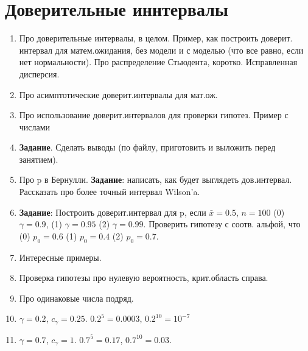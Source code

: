 \section{Доверительные иннтервалы}

\begin{enumerate}
\item	Про доверительные интервалы, в целом. Пример, как построить доверит. интервал для матем.ожидания, без модели и с моделью (что все равно, если нет нормальности). Про распределение Стьюдента, коротко. Исправленная дисперсия.
\item Про асимптотические доверит.интервалы для мат.ож.
\item	Про использование доверит.интервалов для проверки гипотез. Пример с числами
\item	\textbf{Задание}. Сделать выводы (по файлу, приготовить и выложить перед занятием).
\item	Про p в Бернулли. \textbf{Задание}: написать, как будет выглядеть дов.интервал. Рассказать про более точный интервал Wilson’a.
\item	\textbf{Задание}: Построить доверит.интервал для p, если $\bar{x} = 0.5$, $n = 100$ (0) $\gamma = 0.9$, (1) $\gamma = 0.95$ (2) $\gamma = 0.99$. Проверить гипотезу с соотв. альфой, что (0) $p_0 = 0.6$ (1) $p_0=0.4$ (2) $p_0=0.7$.
\item	Интересные примеры.
\item	Проверка гипотезы про нулевую вероятность, крит.область справа.
\item	Про одинаковые числа подряд.
\item	$\gamma = 0.2$, $c_\gamma = 0.25$. $0.2^5 = 0.0003$, $0.2^{10} = 10^{-7}$
\item	$\gamma = 0.7$, $c_\gamma = 1$. $0.7^5 = 0.17$, $0.7^{10} = 0.03$.
\end{enumerate}
